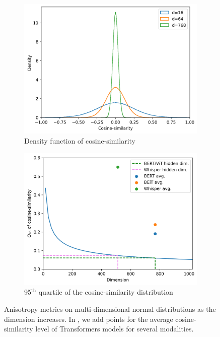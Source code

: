 \begin{figure}[ht]
     \centering
     \begin{subfigure}[b]{0.43\textwidth}
          \includegraphics[width=\linewidth]{sources/part_1/anisotropy/imgs/cosine_v_density.png}
          \caption{Density function of cosine-similarity}
          \label{fig:cosine_v_density}
     \end{subfigure}
     \hfill
     \begin{subfigure}[b]{0.43\textwidth}
          \includegraphics[width=\linewidth]{sources/part_1/anisotropy/imgs/q95_dimension.png}
          \caption{95$^{\text{th}}$\! quartile of the cosine-similarity distribution}
          \label{fig:q95}
     \end{subfigure}
     \caption{Anisotropy metrics on multi-dimensional normal distributions as the dimension increases. In , we add points for the average cosine-similarity level of Transformers models for several modalities.}
     \label{fig:anisotropy_high}
 \end{figure}


